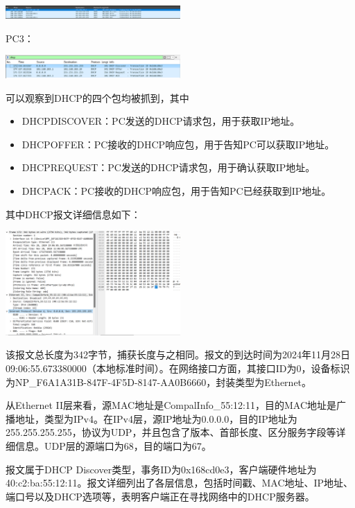 \documentclass{article}
\begin{document}
\vspace{10pt}
\centerline{\includegraphics[width=0.5\textwidth]{3_1_images/5.png}}
\vspace{10pt}
PC3：

\vspace{10pt}
\centerline{\includegraphics[width=0.5\textwidth]{3_1_images/6.png}}
\vspace{10pt}

可以观察到DHCP的四个包均被抓到，其中
\begin{itemize}
\item DHCPDISCOVER：PC发送的DHCP请求包，用于获取IP地址。
\item DHCPOFFER：PC接收的DHCP响应包，用于告知PC可以获取IP地址。
\item DHCPREQUEST：PC发送的DHCP请求包，用于确认获取IP地址。
\item DHCPACK：PC接收的DHCP响应包，用于告知PC已经获取到IP地址。
\end{itemize}


其中DHCP报文详细信息如下：

\vspace{10pt}
\centerline{\includegraphics[width=0.5\textwidth]{3_1_images/6_1.png}}
\vspace{10pt}

该报文总长度为342字节，捕获长度与之相同。报文的到达时间为2024年11月28日09:06:55.673380000（本地标准时间）。在网络接口方面，其接口ID为0，设备标识为NP\_F6A1A31B-847F-4F5D-8147-AA0B6660，封装类型为Ethernet。

从Ethernet II层来看，源MAC地址是CompalInfo\_55:12:11，目的MAC地址是广播地址，类型为IPv4。在IPv4层，源IP地址为0.0.0.0，目的IP地址为255.255.255.255，协议为UDP，并且包含了版本、首部长度、区分服务字段等详细信息。UDP层的源端口为68，目的端口为67。

报文属于DHCP Discover类型，事务ID为0x168cd0e3，客户端硬件地址为40:c2:ba:55:12:11。报文详细列出了各层信息，包括时间戳、MAC地址、IP地址、端口号以及DHCP选项等，表明客户端正在寻找网络中的DHCP服务器。
\end{document}
